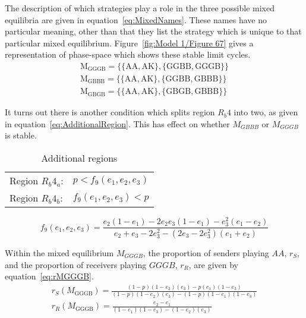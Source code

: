 \documentclass[a4paper,12pt]{article}
\numberwithin{equation}{section}
\begin{document}
The description of which strategies play a role in the three possible mixed equilibria are given in equation~\ref{eq:MixedNames}. These names have no particular meaning, other than that they list the strategy which is unique to that particular mixed equilibrium. Figure~\ref{fig:Model 1/Figure 67} gives a representation of phase-space which shows these stable limit cycles.
\begin{subequations}
\label{eq:MixedNames}
\begin{gather}
\text{M}_{\text{GGGB}}= \{\{ \text{AA}, \text{AK}\}, \{\text{GGBB}, \text{GGGB}\}\}\\
\text{M}_{\text{GBBB}}= \{\{ \text{AA}, \text{AK}\}, \{\text{GGBB}, \text{GBBB}\}\}\\
\text{M}_{\text{GBGB}}= \{\{ \text{AA}, \text{AK}\}, \{\text{GBGB}, \text{GBBB}\}\}
\end{gather}
\end{subequations}

It turns out there is another condition which splits region $R_{b}4$ into two, as given in equation~\ref{eq:AdditionalRegion}. This has effect on whether $M_{GBBB}$ or $M_{GGGB}$ is stable.

\begin{table}[h]
\begin{center}
\begin{tabular}{lc}
Region $R_{b}4_{a}$: & $p<f_{9}(e_{1}, e_{2}, e_{3})$\\
Region $R_{b}4_{b}$: & $f_{9}(e_{1}, e_{2}, e_{3})<p$
\end{tabular}
\end{center}
\caption{Additional regions}
\label{tab:CueGamewithObservableAmplification/AdditionalRegion}
\end{table}

\begin{equation}
\label{eq:AdditionalRegion}
f_{9}(e_{1}, e_{2}, e_{3})=\frac{e_{2}(1-e_{1})-2 e_{2} e_{3}(1-e_{1})-e_{3}^2 (e_{1}-e_{2})}{e_{2}+e_{3}-2 e_{3}^2-\left(2 e_{3}-2 e_{3}^2\right) (e_{1}+e_{2})}
\end{equation}

Within the mixed equilibrium $M_{GGGB}$, the proportion of senders playing $AA$, $r_{S}$, and the proportion of receivers playing $GGGB$, $r_{R}$, are given by equation~\ref{eq:rMGGGB}.
\begin{subequations}
\label{eq:rMGGGB}
\begin{gather}
r_{S}(M_{\text{GGGB}})=\frac{(1-p)(1-e_{2})(e_{3})-p(e_{1})(1-e_{3})}{(1-p)(1-e_{2})(e_{3})-(1-p)(1-e_{1})(1-e_{3})}\\
r_{R}(M_{\text{GGGB}})=\frac{e_{2}-e_{1}}{(1-e_{1})(1-e_{3})-(1-e_{2})(e_{3})}
\end{gather}
\end{subequations}
\end{document}
